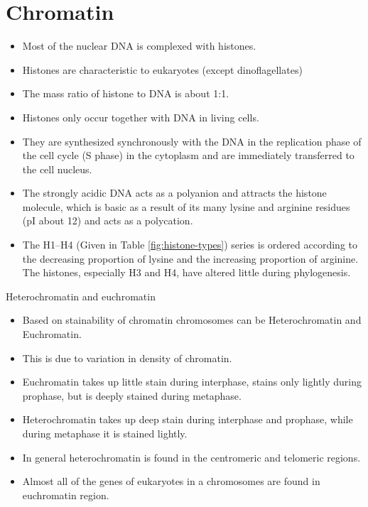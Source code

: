 \documentclass[11pt,dvipsnames,ignorenonframetext,aspectratio=169]{beamer}
\providecommand{\tightlist}{%
  \setlength{\itemsep}{0pt}\setlength{\parskip}{0pt}}
\begin{document}
\hypertarget{chromatin}{%
\section{Chromatin}\label{chromatin}}

\begin{frame}{}
\protect\hypertarget{section-8}{}

\small

\begin{itemize}
\tightlist
\item
  Most of the nuclear DNA is complexed with histones.
\item
  Histones are characteristic to eukaryotes (except dinoflagellates)
\item
  The mass ratio of histone to DNA is about 1:1.
\item
  Histones only occur together with DNA in living cells.
\item
  They are synthesized synchronously with the DNA in the replication
  phase of the cell cycle (S phase) in the cytoplasm and are immediately
  transferred to the cell nucleus.
\item
  The strongly acidic DNA acts as a polyanion and attracts the histone
  molecule, which is basic as a result of its many lysine and arginine
  residues (pI about 12) and acts as a polycation.
\item
  The H1--H4 (Given in Table \ref{fig:histone-types}) series is ordered
  according to the decreasing proportion of lysine and the increasing
  proportion of arginine. The histones, especially H3 and H4, have
  altered little during phylogenesis.
\end{itemize}

\end{frame}

\begin{frame}{Heterochromatin and euchromatin}
\protect\hypertarget{heterochromatin-and-euchromatin}{}

\begin{itemize}
\tightlist
\item
  Based on stainability of chromatin chromosomes can be Heterochromatin
  and Euchromatin.
\item
  This is due to variation in density of chromatin.
\item
  Euchromatin takes up little stain during interphase, stains only
  lightly during prophase, but is deeply stained during metaphase.
\item
  Heterochromatin takes up deep stain during interphase and prophase,
  while during metaphase it is stained lightly.
\item
  In general heterochromatin is found in the centromeric and telomeric
  regions.
\item
  Almost all of the genes of eukaryotes in a chromosomes are found in
  euchromatin region.
\end{itemize}

\end{frame}
\end{document}
